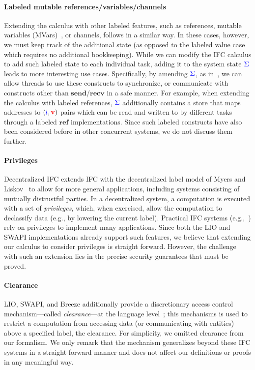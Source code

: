 \documentclass{sigplanconf}
\begin{document}
\paragraph{Labeled mutable references/variables/channels}
%
Extending the calculus with other labeled features, such as
references, mutable variables (MVars)~\cite{CH96}, or channels,
follows in a similar way.
%
In these cases, however, we must keep track of the additional state
(as opposed to the labeled value case which requires no additional
bookkeeping).
%
While we can modify the IFC calculus to add such labeled state to each
individual task, adding it to the system state \ensuremath{\ifc{\Sigma}} leads to more
interesting use cases.
%
Specifically, by amending \ensuremath{\ifc{\Sigma}}, as in~\cite{lio,
stefan:addressing-covert}, we can allow threads to use these
constructs to synchronize, or communicate with constructs other than
\ensuremath{\mathbf{send}}/\ensuremath{\mathbf{recv}} in a safe manner.
%
For example, when extending the calculus with labeled references, \ensuremath{\ifc{\Sigma}}
additionally contains a store that maps addresses to \ensuremath{(\ifc{l},\tar{v})} pairs
which can be read and written to by different tasks through a labeled
\ensuremath{\mathbf{ref}} implementations.
%
Since such labeled constructs have also been considered before in other
concurrent systems, we do not discuss them further.

\paragraph{Privileges}
Decentralized IFC extends IFC with the decentralized label model of
Myers and Liskov~\cite{myers:dlm} to allow for more general
applications, including systems consisting of mutually distrustful
parties.  In a decentralized system, a computation is executed with a
set of \emph{privileges}, which, when exercised, allow the computation
to declassify data (e.g., by lowering the current label).
%
Practical IFC systems
(e.g.,~\cite{Zeldovich:2006, lio,
Hritcu:2013:YIB:2497621.2498098, myers:jif}) rely on privileges to
implement many applications.
%
Since both the LIO and SWAPI implementations already support such features,
we believe that extending our calculus to consider privileges is
straight forward.
%
However, the challenge with such an extension lies in the precise
security guarantees that must be proved.
%

\paragraph{Clearance}
%
LIO, SWAPI, and Breeze additionally provide a discretionary access
control mechanism---called \emph{clearance}---at the language
level~\cite{Hritcu:2013:YIB:2497621.2498098, lio}; this mechanisms is
used to restrict a computation from accessing data (or communicating
with entities) above a specified label, the clearance.
%
For simplicity, we omitted clearance from our formalism.
%
We only remark that the mechanism generalizes beyond these IFC systems
in a straight forward manner and does not affect our definitions or
proofs in any meaningful way.
\end{document}
